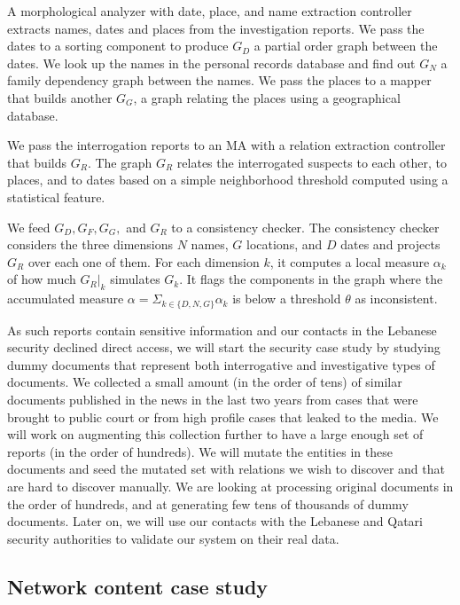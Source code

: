\documentclass[12pt]{article}
\begin{document}
A morphological analyzer with date, place, and name extraction controller extracts
names, dates and places from the investigation reports. 
We pass the dates to a sorting component to produce $G_D$ 
a partial order graph between the dates. 
We look up the names in the personal records database and find out
$G_N$ a family dependency graph between the names. 
We pass the places to a mapper that builds another $G_G$,
a graph relating the places using a geographical database. 

We pass the interrogation reports to an MA with a relation 
extraction controller that builds $G_R$. 
The graph $G_R$ relates the interrogated suspects
to each other, to places, and to dates based on a simple
neighborhood threshold computed using a statistical feature. 

We feed $G_D, G_F, G_G,$ and $G_R$   
to a consistency checker.
The consistency checker considers the three dimensions 
$N$ names, $G$ locations, and $D$ dates and projects $G_R$
over each one of them.
For each dimension $k$, it computes a local measure 
$\alpha_k$ of how much $G_R|_k$ simulates $G_k$. 
It flags the components in the graph where the accumulated 
measure $\alpha= \Sigma_{k\in\{D,N,G\}} \alpha_k$ is
below a threshold $\theta$ as inconsistent. 

As such reports contain sensitive information and our contacts
in the Lebanese security declined direct access, 
we will start the security case study by studying dummy documents that 
represent both interrogative and investigative types of documents. 
We collected a small amount (in the order of tens)
of similar documents published in the news in the last two years
from cases that were brought to public court or from high profile
cases that leaked to the media.
We will work on augmenting this collection further to have a large
enough set of reports (in the order of hundreds). 
We will mutate the entities in these documents and seed the mutated
set with relations we wish to discover and that are hard to discover
manually. 
We are looking at processing original documents in the order
of hundreds, and at generating few tens of thousands of dummy 
documents.
Later on, we will use our contacts with the Lebanese and Qatari 
security authorities
to validate our system on their real data. 

\subsection{Network content case study}
\label{s:design:net}
\end{document}
